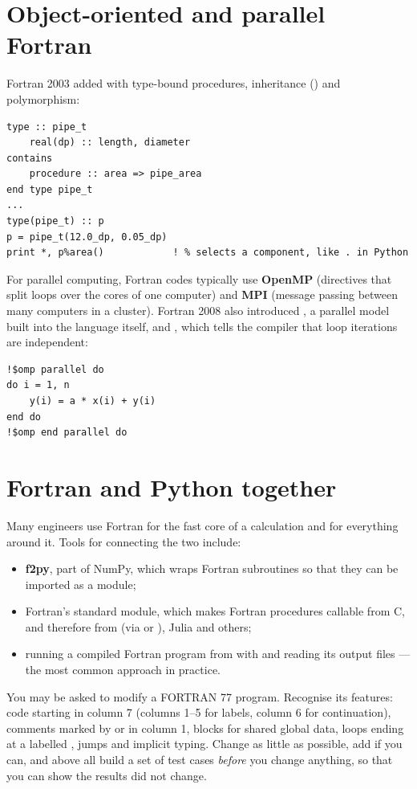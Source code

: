 \section{Object-oriented and parallel Fortran}

Fortran 2003 added  with type-bound procedures, inheritance
() and polymorphism:
\begin{lstlisting}[language={[08]Fortran}]
type :: pipe_t
    real(dp) :: length, diameter
contains
    procedure :: area => pipe_area
end type pipe_t
...
type(pipe_t) :: p
p = pipe_t(12.0_dp, 0.05_dp)
print *, p%area()            ! % selects a component, like . in Python
\end{lstlisting}
For parallel computing, Fortran codes typically use \textbf{OpenMP} (directives that
split loops over the cores of one computer) and \textbf{MPI} (message passing between many
computers in a cluster). Fortran 2008 also introduced , a parallel model
built into the language itself, and , which tells the compiler that
loop iterations are independent:
\begin{lstlisting}[language={[08]Fortran}]
!$omp parallel do
do i = 1, n
    y(i) = a * x(i) + y(i)
end do
!$omp end parallel do
\end{lstlisting}

\section{Fortran and Python together}

Many engineers use Fortran for the fast core of a calculation and \py for everything
around it. Tools for connecting the two include:
\begin{itemize}
\item \textbf{f2py}, part of NumPy, which wraps Fortran subroutines so that they can be
  imported as a \py module;
\item Fortran's standard  module, which makes Fortran procedures
  callable from C, and therefore from \py (via  or ), Julia and
  others;
\item running a compiled Fortran program from \py with  and reading its
  output files --- the most common approach in practice.
\end{itemize}

\begin{engnote}
You may be asked to modify a FORTRAN 77 program. Recognise its features: code starting in
column 7 (columns 1--5 for labels, column 6 for continuation), comments marked by 
or \code{*} in column 1,  blocks for shared global data, 
loops ending at a labelled ,  jumps and implicit typing.
Change as little as possible, add  if you can, and above all build a
set of test cases \emph{before} you change anything, so that you can show the results did
not change.
\end{engnote}

